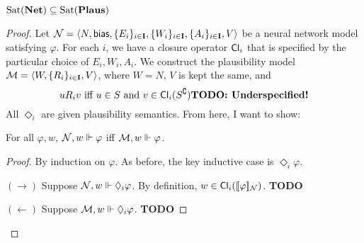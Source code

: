 \documentclass[letterpaper]{article}
\begin{document}
\begin{proposition}
    $\mathrm{Sat}( \textrm{\textbf{Net}} ) \subseteq \mathrm{Sat}( \textrm{\textbf{Plaus}} )$
\end{proposition}
\begin{proof}
    Let $\mathcal{N} = \langle N, \mathsf{bias}, \{ E_i \}_{i \in \textbf{I}}, \{ W_i \}_{i \in \textbf{I}}, \{ A_i \}_{i \in \textbf{I}}, V \rangle$ be a neural network model satisfying $\varphi$.  For each $i$, we have a closure operator $\mathsf{Cl}_i$ that is specified by the particular choice of $E_i, W_i, A_i$.  We construct the plausibility model $\mathcal{M} = \langle W, \{ R_i \}_{i \in \textbf{I}}, V \rangle$, where $W = N$, $V$ is kept the same, and
    \[ u{R_i}v \mbox{ iff } u \in S \mbox{ and } v \in \mathsf{Cl}_i(S^\complement) \mbox{\textbf{TODO: Underspecified!}} \]
    All $\Diamond_i$ are given plausibility semantics.  From here, I want to show:
    
    \begin{claim*}
        For all $\varphi, w$, $\mathcal{N}, w \Vdash \varphi$ iff $\mathcal{M}, w \Vdash \varphi$.
    \end{claim*}
    \begin{proof}
        By induction on $\varphi$.  As before, the key inductive case is $\Diamond_i \varphi$.

        $(\rightarrow)$ Suppose $\mathcal{N}, w \Vdash \Diamond_i \varphi$.  By definition, $w \in \mathsf{Cl}_i([\![\mbox{\em $ \varphi $\/}]\!]_{\mathcal{N}})$. \textbf{TODO} 

        $(\leftarrow)$ Suppose $\mathcal{M}, w \Vdash \Diamond_i \varphi$.  \textbf{TODO}
    \end{proof}

    
\end{proof}


\end{document}
